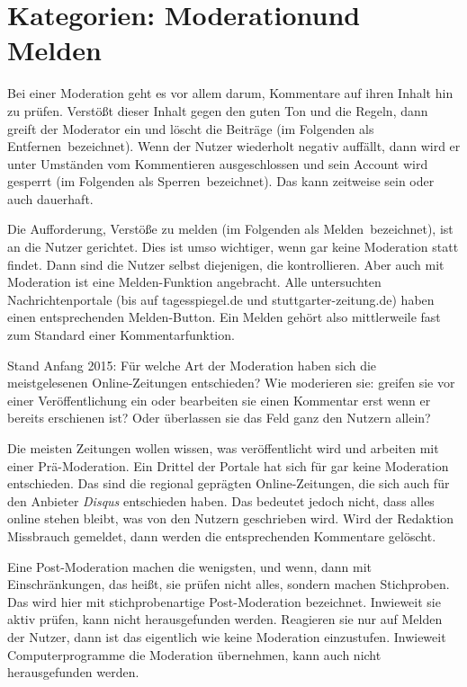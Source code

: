 \section{Kategorien: \glqq Moderation\grqq und \glqq Melden\grqq}

Bei einer Moderation geht es vor allem darum, Kommentare auf ihren Inhalt hin zu
prüfen. Verstößt dieser Inhalt gegen den guten Ton und die Regeln, dann greift
der Moderator ein und löscht die Beiträge (im Folgenden als \glqq
Entfernen\grqq\ bezeichnet). Wenn der Nutzer wiederholt negativ auffällt, dann
wird er unter Umständen vom Kommentieren ausgeschlossen und sein Account wird
gesperrt (im Folgenden als  \glqq Sperren\grqq\ bezeichnet). Das kann zeitweise
sein oder auch dauerhaft.

Die Aufforderung, Verstöße zu melden (im Folgenden als \glqq Melden\grqq\
bezeichnet), ist an die Nutzer gerichtet. Dies ist umso wichtiger, wenn gar
keine Moderation statt findet. Dann sind die Nutzer selbst diejenigen, die
kontrollieren. Aber auch mit Moderation ist eine Melden-Funktion angebracht.
Alle  untersuchten Nachrichtenportale (bis auf tagesspiegel.de und stuttgarter-zeitung.de) haben einen
entsprechenden Melden-Button. Ein \glqq Melden\grqq\- gehört also 
mittlerweile fast zum Standard einer Kommentarfunktion. 

Stand Anfang 2015: Für welche Art der Moderation haben sich die meistgelesenen
Online-Zeitungen entschieden? Wie moderieren sie: greifen sie vor einer
Veröffentlichung ein oder bearbeiten sie einen Kommentar erst wenn er bereits
erschienen ist? Oder überlassen sie das Feld ganz den Nutzern allein?

Die meisten Zeitungen wollen wissen, was veröffentlicht wird und arbeiten mit
einer Prä-Moderation.  Ein Drittel der Portale hat sich für gar keine Moderation
entschieden. Das sind die regional geprägten Online-Zeitungen, die sich auch für
den Anbieter {\slshape Disqus} entschieden haben. Das bedeutet jedoch nicht,
dass alles online stehen bleibt, was von den Nutzern geschrieben wird.  Wird der
Redaktion Missbrauch gemeldet, dann werden die entsprechenden Kommentare
gelöscht.

Eine Post-Moderation machen die wenigsten, und wenn, dann mit Einschränkungen,
das heißt, sie prüfen nicht alles, sondern machen Stichproben. Das wird hier mit
\glqq stichprobenartige Post-Moderation\grqq{} bezeichnet. Inwieweit sie aktiv
prüfen, kann nicht herausgefunden werden. Reagieren sie nur auf Melden der
Nutzer, dann ist das eigentlich wie \glqq keine Moderation\grqq{} einzustufen.
Inwieweit Computerprogramme die Moderation übernehmen, kann auch nicht
herausgefunden werden.

